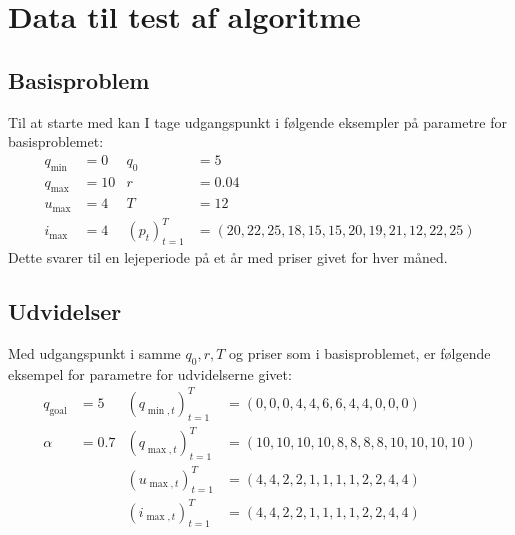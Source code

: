 \section{Data til test af algoritme}
\label{sec:data}

\subsection{Basisproblem}
\label{subsec:basisdata}
Til at starte med kan I tage udgangspunkt i følgende eksempler på parametre for basisproblemet:
\begin{align*}
  q_{\min} &= 0 & q_{0} &= 5 \\
  q_{\max} &= 10 & r &= 0.04 \\
  u_{\max} &= 4 &  T &= 12 \\
  i_{\max} &= 4 &  (p_{t})_{t=1}^{T} &= (20, 22, 25, 18, 15, 15, 20, 19, 21, 12, 22, 25)
\end{align*}
Dette svarer til en lejeperiode på et år med priser givet for hver måned.

\subsection{Udvidelser}
\label{subsec:extensionsdata}
Med udgangspunkt i samme \(q_{0}, r, T\) og priser som i basisproblemet, er følgende eksempel for parametre for udvidelserne givet:
\begin{align*}
  q_{\mathrm{goal}} & = 5   & (q_{\min,t})_{t=1}^{T} & = (0, 0, 0, 4, 4, 6, 6, 4, 4, 0, 0, 0)          \\
  \alpha            & = 0.7 & (q_{\max,t})_{t=1}^{T} & = (10, 10, 10, 10, 8, 8, 8, 8, 10, 10, 10, 10)  \\
                    &       & (u_{\max,t})_{t=1}^{T} & = (4, 4, 2, 2, 1, 1, 1, 1, 2, 2, 4, 4)          \\
                    &       & (i_{\max,t})_{t=1}^{T} & = (4, 4, 2, 2, 1, 1, 1, 1, 2, 2, 4, 4)
\end{align*}
